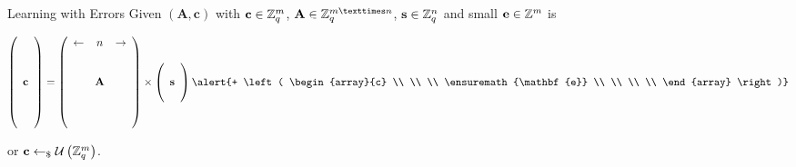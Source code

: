\documentclass[presentation,smaller]{beamer}
\newcommand{\ZZ}[1][blank]{\ensuremath{\ifthenelse{\equal{#1}{blank}}{\mathbb{Z}}{\mathbb{Z}\left[#1\right]}\xspace}}
\newcommand{\ZZq}[1][blank]{\ensuremath{\ifthenelse{\equal{#1}{blank}}{\mathbb{Z}_q}{\mathbb{Z}_q\left[#1\right]}\xspace}}
\renewcommand{\U}[1]{\ensuremath{\mathcal{U}\left( {#1} \right)}\xspace}
\renewcommand{\vec}[1]{\ensuremath{\mathbf{#1}}\xspace}
\newcommand{\sample}{\ensuremath{\leftarrow_{\$}}}
\begin{document}
\begin{frame}[label={sec:org072e156}]{Learning with Errors}
Given \((\vec{A},\vec{c})\) with \(\vec{c} \in \ZZq^{m}\), \(\vec{A} \in \ZZq^{m × n}\), \(\vec{s} \in \ZZq^{n}\) and \alert{small \(\vec{e} \in \ZZ^{m}\)} is

\[
\left(\begin{array}{c}
\\
\\
\\ 
\vec{c} \\
\\
\\
\\
\end{array} \right) = \left(
\begin{array}{ccc}
\leftarrow & n & \rightarrow \\
\\
\\ 
& \vec{A} & \\
\\
\\
\\
\end{array} \right) \times \left( \begin{array}{c}
\\
\vec{s} \\
\\
\end{array} \right) \alert{+ \left(
\begin{array}{c}
\\
\\
\\ 
\vec{e} \\
\\
\\
\\
\end{array} 
\right)}
\]

or \(\vec{c} \sample \U{\ZZq^{m}}\).
\end{frame}
\end{document}

